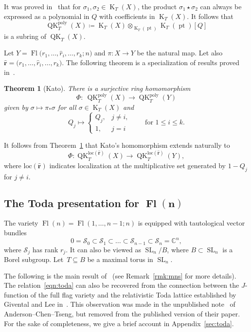 \documentclass[11pt]{article}
\numberwithin{equation}{section}
\numberwithin{equation}{section}
\newtheorem{Theorem}{Theorem}[section]
\theoremstyle{definition}
\DeclareMathOperator{\SL}{SL}
\DeclareMathOperator{\Fl}{Fl}
\DeclareMathOperator{\QK}{QK}
\DeclareMathOperator{\K}{K}
\DeclareMathOperator{\pt}{pt}
\def\poly{{\mathrm{poly}}}
\def\loc{{\mathrm{loc}}}
\newcommand{\C}{{\mathbb C}}
\newcommand{\cS}{{\mathcal S}}
\begin{document}
It was proved in~\cite{anderson2022finite, kato:loop} that for $\sigma_1,\sigma_2\in\K_T(X)$, the product $\sigma_1\star\sigma_2$ can always be expressed as a polynomial in $Q$ with coefficients in $\K_T(X)$. It follows that
\[
 \QK_T^\poly(X)\coloneqq\K_T(X) \otimes_{\K_T(\pt)}\K_T(\pt)[Q]
\]
is a subring of $\QK_T(X)$.

Let $Y=\Fl\bigl(r_1,\dots, \widehat{r}_i,\dots, r_k;n\bigr)$ and $\pi\colon X\to Y$ be the natural map. Let also $\widehat{\mathbf{r}} = \bigl(r_1, \dots,\allowbreak \widehat{r}_i,\dots, r_k\bigr)$. The following theorem is a specialization of results proved in~\cite{kato2019quantum}.

\begin{Theorem}[Kato]\label{thm:kato-morphism}
 There is a surjective ring homomorphism
 \[
 \Phi\colon\ \QK^\poly_T(X)\to\QK^\poly_T(Y)
 \]
 given by $\sigma\mapsto{\pi}_*\sigma$ for all $\sigma\in\K_T(X)$ and
 \[
 Q_j\mapsto\begin{cases}
 Q_j, & j\neq i,\\
 1, & j=i
 \end{cases} \qquad \text{for $1\leq i\leq k$}.\]
\end{Theorem}
It follows from Theorem~\ref{thm:kato-morphism} that
Kato's homomorphism extends naturally to
\begin{equation}\label{E:Kato-loc-hom}
\Phi\colon \QK_T^{\loc(\mathbf{\hat r})}(X) \to
\QK_T^{\loc(\mathbf{\hat r})}(Y) ,
\end{equation}
where $\loc(\mathbf{\hat r})$ indicates localization at the multiplicative set generated by
$1- Q_j$ for $j \neq i$.

\subsection[The Toda presentation for Fl(n)]{The Toda presentation for $\boldsymbol{\Fl(n)}$}

The variety $\Fl(n)=\Fl(1,\dots,n-1;n)$ is equipped with tautological vector bundles
\[
 0=\cS_{0}\subset\cS_{1}\subset\dots \subset \cS_{n-1}\subset \cS_{n}=\C^n ,
\]
where $\cS_j$ has rank $r_j$. It can also be viewed as $\SL_n/B$, where $B\subset \SL_n$ is a Borel subgroup. Let~${T\subseteq B}$ be a maximal torus in $\SL_n$.

The following is the main result of~\cite{maeno.naito.sagaki:QKideal} (see Remark~\ref{rmk:mns} for more details). The relation~\eqref{eqn:toda} can also be recovered from the connection between the $J$-function of the full flag variety and the relativistic Toda lattice established by Givental and Lee in~\cite{givental_lee}. This observation was made in the unpublished note~\cite{act:2017} of Anderson--Chen--Tseng, but removed from the published version of their paper. For the sake of completeness, we give a brief account in Appendix~\ref{sec:toda}.
\end{document}
